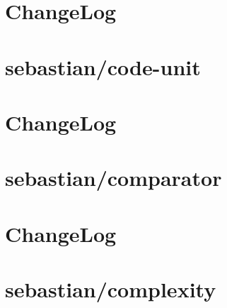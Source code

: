 \documentclass[twoside]{book}
\newcommand{\+}{\discretionary{\mbox{\scriptsize$\hookleftarrow$}}{}{}}
\begin{document}
\chapter{Change\+Log}
\label{md__c__workspace__proyecto__p_h_p_project_vendor_sebastian_code_unit__change_log}

\chapter{sebastian/code-\/unit}
\label{md__c__workspace__proyecto__p_h_p_project_vendor_sebastian_code_unit__r_e_a_d_m_e}

\chapter{Change\+Log}
\label{md__c__workspace__proyecto__p_h_p_project_vendor_sebastian_comparator__change_log}

\chapter{sebastian/comparator}
\label{md__c__workspace__proyecto__p_h_p_project_vendor_sebastian_comparator__r_e_a_d_m_e}

\chapter{Change\+Log}
\label{md__c__workspace__proyecto__p_h_p_project_vendor_sebastian_complexity__change_log}

\chapter{sebastian/complexity}
\label{md__c__workspace__proyecto__p_h_p_project_vendor_sebastian_complexity__r_e_a_d_m_e}

\end{document}
